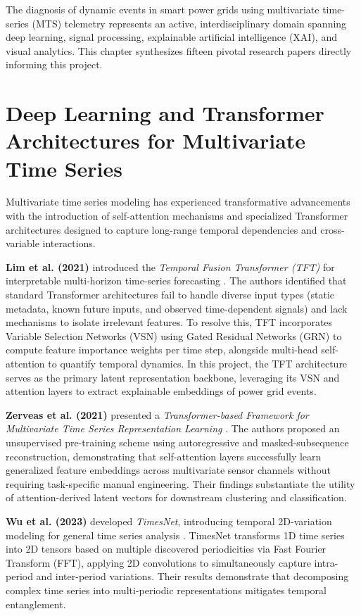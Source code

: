 \documentclass[12pt,a4paper]{report}
\begin{document}
The diagnosis of dynamic events in smart power grids using multivariate time-series (MTS) telemetry represents an active, interdisciplinary domain spanning deep learning, signal processing, explainable artificial intelligence (XAI), and visual analytics. This chapter synthesizes fifteen pivotal research papers directly informing this project.

\section{Deep Learning and Transformer Architectures for Multivariate Time Series}
Multivariate time series modeling has experienced transformative advancements with the introduction of self-attention mechanisms and specialized Transformer architectures designed to capture long-range temporal dependencies and cross-variable interactions.

\textbf{Lim et al. (2021)} introduced the \textit{Temporal Fusion Transformer (TFT)} for interpretable multi-horizon time-series forecasting \cite{ref_lim2021_tft}. The authors identified that standard Transformer architectures fail to handle diverse input types (static metadata, known future inputs, and observed time-dependent signals) and lack mechanisms to isolate irrelevant features. To resolve this, TFT incorporates Variable Selection Networks (VSN) using Gated Residual Networks (GRN) to compute feature importance weights per time step, alongside multi-head self-attention to quantify temporal dynamics. In this project, the TFT architecture serves as the primary latent representation backbone, leveraging its VSN and attention layers to extract explainable embeddings of power grid events.

\textbf{Zerveas et al. (2021)} presented a \textit{Transformer-based Framework for Multivariate Time Series Representation Learning} \cite{ref_zerveas2021_transformer}. The authors proposed an unsupervised pre-training scheme using autoregressive and masked-subsequence reconstruction, demonstrating that self-attention layers successfully learn generalized feature embeddings across multivariate sensor channels without requiring task-specific manual engineering. Their findings substantiate the utility of attention-derived latent vectors for downstream clustering and classification.

\textbf{Wu et al. (2023)} developed \textit{TimesNet}, introducing temporal 2D-variation modeling for general time series analysis \cite{ref_wu2023_timesnet}. TimesNet transforms 1D time series into 2D tensors based on multiple discovered periodicities via Fast Fourier Transform (FFT), applying 2D convolutions to simultaneously capture intra-period and inter-period variations. Their results demonstrate that decomposing complex time series into multi-periodic representations mitigates temporal entanglement.
\end{document}

